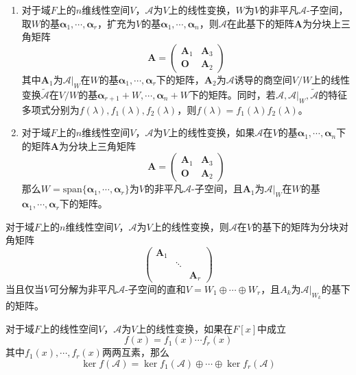 \documentclass[lang = cn, scheme = chinese, thmcnt = section]{elegantbook}
\newcommand{\bs}{\boldsymbol}          %
\begin{document}
\begin{theorem}
	\begin{enumerate}
		\item 对于域$F$上的$n$维线性空间$V$，$\mathscr{A}$为$V$上的线性变换，$W$为$V$的非平凡$\mathscr{A}$-子空间，取$W$的基$\bs{\alpha}_1,\cdots,\bs{\alpha}_r$，扩充为$V$的基$\bs{\alpha}_1,\cdots,\bs{\alpha}_n$，则$\mathscr{A}$在此基下的矩阵$\bs{A}$为分块上三角矩阵%
		$$
		\bs{A}=\begin{pmatrix}
			\bs{A}_1 & \bs{A}_3\\
			\bs{O} & \bs{A}_2
		\end{pmatrix}
		$$
		其中$\bs{A}_1$为$\mathscr{A}|_{W}$在$W$的基$\bs{\alpha}_1,\cdots,\bs{\alpha}_r$下的矩阵，$\bs{A}_2$为$\mathscr{A}$诱导的商空间$V/W$上的线性变换$\tilde{\mathscr{A}}$在$V/W$的基$\bs{\alpha}_{r+1}+W,\cdots,\bs{\alpha}_{n}+W$下的矩阵。同时，若$\mathscr{A},\mathscr{A}|_W,\tilde{\mathscr{A}}$的特征多项式分别为$f(\lambda),f_1(\lambda),f_2(\lambda)$，则$f(\lambda)=f_1(\lambda)f_2(\lambda)$。
		\item 对于域$F$上的$n$维线性空间$V$，$\mathscr{A}$为$V$上的线性变换，如果$\mathscr{A}$在$V$的基$\bs{\alpha}_1,\cdots,\bs{\alpha}_n$下的矩阵$\bs{A}$为分块上三角矩阵%
		$$
		\bs{A}=\begin{pmatrix}
			\bs{A}_1 & \bs{A}_3\\
			\bs{O} & \bs{A}_2
		\end{pmatrix}
		$$
		那么$W=\text{span}\{ \bs{\alpha}_1,\cdots,\bs{\alpha}_r \}$为$V$的非平凡$\mathscr{A}$-子空间，且$\bs{A}_1$为$\mathscr{A}|_{W}$在$W$的基$\bs{\alpha}_1,\cdots,\bs{\alpha}_r$下的矩阵。
	\end{enumerate}
\end{theorem}

\begin{theorem}
	对于域$F$上的$n$维线性空间$V$，$\mathscr{A}$为$V$上的线性变换，则$\mathscr{A}$在$V$的基下的矩阵为分块对角矩阵%
	$$
	\begin{pmatrix}
		\bs{A}_1 & & \\
		& \ddots & \\
		& & \bs{A}_r
	\end{pmatrix}
	$$
	当且仅当$V$可分解为非平凡$\mathscr{A}$-子空间的直和$V=W_1\oplus \cdots\oplus W_r$，且$A_k$为$\mathscr{A}|_{W_k}$的基下的矩阵。
\end{theorem}

\begin{theorem}
	对于域$F$上的线性空间$V$，$\mathscr{A}$为$V$上的线性变换，如果在$F[x]$中成立%
	$$
	f(x)=f_1(x)\cdots f_r(x)
	$$
	其中$f_1(x),\cdots,f_r(x)$两两互素，那么%
	$$
	\ker f(\mathscr{A})=\ker f_1(\mathscr{A})\oplus \cdots\oplus \ker f_r(\mathscr{A})
	$$
\end{theorem}
\end{document}
